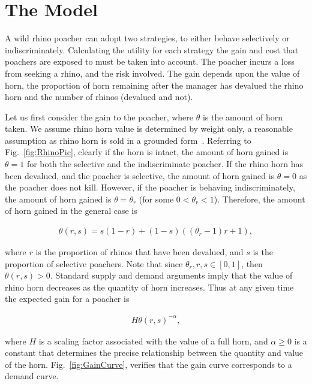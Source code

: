 \documentclass[10pt]{article}
\begin{document}
\section{The Model}\label{section:the_model}

A wild rhino poacher can adopt two strategies, to either behave selectively
or indiscriminately. Calculating the utility for each strategy the gain and cost
that poachers are exposed to must be taken into account. The poacher incurs a
loss from seeking a rhino, and the risk involved. The gain depends upon the value
of horn, the proportion of horn remaining after the manager has devalued the 
rhino horn and the number of rhinos (devalued and not).

Let us first consider the gain to the poacher, where \(\theta\) is the amount of 
horn taken. We assume rhino horn value is determined by weight only, a 
reasonable assumption as rhino horn is sold in a grounded form~\cite{Saverhino}.
Referring to Fig.~\ref{fig:RhinoPic}, clearly if the horn is intact, the amount of
horn gained is \(\theta=1\) for both the selective and the indiscriminate poacher.
If the rhino horn has been devalued, and the poacher is selective, the amount of horn 
gained is \(\theta=0\) as the poacher does not kill. However, if the poacher is 
behaving indiscriminately, the amount of horn gained is \(\theta = \theta_r\)
(for some \(0<\theta_r<1\)). 
Therefore, the amount of horn gained in the general case is

\begin{eqnarray}
	\label{eqn:theta}
	\theta(r, s) = s (1 - r) + (1 - s) ((\theta_r - 1) r + 1),
\end{eqnarray}

where \(r\) is the proportion of rhinos that have been devalued, and \(s\) is the 
proportion of selective poachers. Note that since \(\theta_r, r, s  \in [0, 1]\), then
\(\theta(r, s) > 0\). Standard supply and demand arguments imply that the value
of rhino horn decreases as the quantity of horn increases. Thus at any given time
the expected gain for a poacher is

\begin{eqnarray}
	\label{eqn:individual_gain}
 	H \theta(r,s)^{-\alpha},
\end{eqnarray}

where \(H\) is a scaling factor associated with the value of a full horn, and 
\(\alpha \geq 0\) is a constant that determines the precise relationship between
the quantity and value of the horn.  Fig.~\ref{fig:GainCurve}, verifies that the 
gain curve corresponds to a demand curve.
\end{document}
